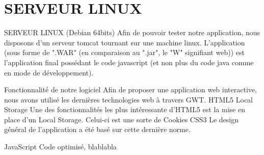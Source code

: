 \section{SERVEUR LINUX}
SERVEUR LINUX (Debian 64bits)
Afin de pouvoir tester notre application, nous disposons d'un serveur tomcat tournant sur une machine linux. L'application (sous forme de ".WAR" (en comparaison au ".jar", le "W" signifiant web)) est l'application final possédant le code javascript (et non plus du code java comme en mode de développement).

Fonctionnalité de notre logiciel
Afin de proposer une application web interactive, nous avons utilisé les dernières technologies web à travers GWT.
HTML5
	Local Storage
Une des fonctionnalités les plus intéressante d'HTML5 est la mise en place d'un Local Storage. Celui-ci est une sorte de Cookies
	CSS3
	Le design général de l'application a été basé sur cette dernière norme.

	JavaScript
	Code optimisé, blablabla